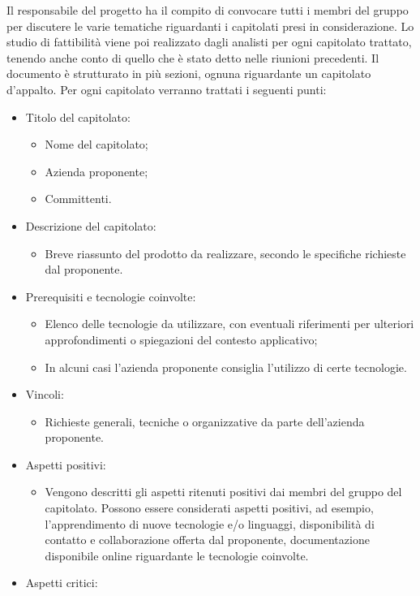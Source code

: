 Il responsabile del progetto ha il compito di convocare tutti i membri del gruppo \Gruppo per discutere le varie tematiche riguardanti i capitolati presi in considerazione.
Lo studio di fattibilità viene poi realizzato dagli analisti per ogni capitolato trattato, tenendo anche conto di quello che è stato detto nelle riunioni precedenti.
Il documento è strutturato in più sezioni, ognuna riguardante un capitolato d'appalto.
Per ogni capitolato verranno trattati i seguenti punti:
\begin{itemize}
\item Titolo del capitolato:
	\begin{itemize}
	\item Nome del capitolato;
	\item Azienda proponente;
	\item Committenti.
	\end{itemize}
\item Descrizione del capitolato:
	\begin{itemize}
	\item Breve riassunto del prodotto da realizzare, secondo le specifiche richieste dal proponente.
	\end{itemize}
\item Prerequisiti e tecnologie coinvolte:
	\begin{itemize}
	\item Elenco delle tecnologie da utilizzare, con eventuali riferimenti per ulteriori approfondimenti o spiegazioni del contesto applicativo;
	\item In alcuni casi l'azienda proponente consiglia l'utilizzo di certe tecnologie.
	\end{itemize}
\item Vincoli:
	\begin{itemize}
	\item Richieste generali, tecniche o organizzative da parte dell'azienda proponente.
	\end{itemize}
\item Aspetti positivi:
	\begin{itemize}
	\item Vengono descritti gli aspetti ritenuti positivi dai membri del gruppo \Gruppo del capitolato.
	Possono essere considerati aspetti positivi, ad esempio, l'apprendimento di nuove tecnologie e/o linguaggi, disponibilità di contatto e collaborazione offerta dal proponente, documentazione disponibile online riguardante le tecnologie coinvolte.
	\end{itemize}
\item Aspetti critici:

\end{itemize}
